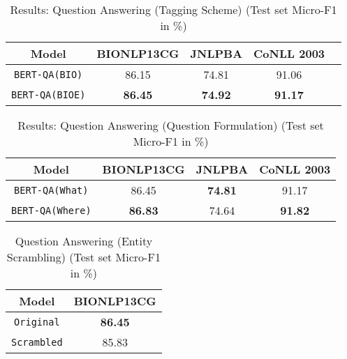 \begin{table}[h!]
\centering
\begin{tabular}{|c|c|c|c|c|}\hline
	\textbf{Model} & \textbf{BIONLP13CG} & \textbf{JNLPBA} & \textbf{CoNLL 2003}\\\hline
	\texttt{BERT-QA(BIO)} & 86.15 & 74.81 & 91.06\\\hline
	\texttt{BERT-QA(BIOE)} & \textbf{86.45} & \textbf{74.92} & \textbf{91.17}\\\hline
	\end{tabular}
    \caption{Results: Question Answering (Tagging Scheme) (Test set Micro-F1 in \%)}
    \label{tab:res_qa_tagging}
\end{table}

\begin{table}[h!]
\centering
\begin{tabular}{|c|c|c|c|}\hline
	\textbf{Model} & \textbf{BIONLP13CG} & \textbf{JNLPBA} & \textbf{CoNLL 2003}\\\hline
	\texttt{BERT-QA(What)} & 86.45 & \textbf{74.81} & 91.17\\\hline
	\texttt{BERT-QA(Where)} & \textbf{86.83} & 74.64 & \textbf{91.82}\\\hline
	\end{tabular}
    \caption{Results: Question Answering (Question Formulation) (Test set Micro-F1 in \%)}
    \label{tab:res_qa_question}
\end{table}

\begin{table}[h!]
\centering
\begin{tabular}{|c|c|}\hline
	\textbf{Model} & \textbf{BIONLP13CG}\\\hline
	\texttt{Original} & \textbf{86.45}\\\hline
	\texttt{Scrambled} & 85.83\\\hline
	\end{tabular}
    \caption{Question Answering (Entity Scrambling) (Test set Micro-F1 in \%)}
    \label{tab:res_qa_scrable}
\end{table}

